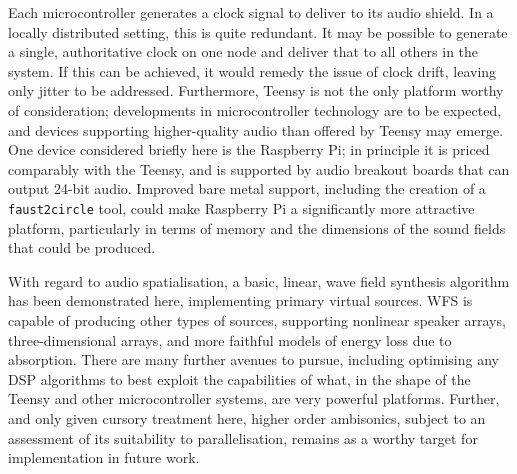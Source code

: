Each microcontroller generates a clock signal to deliver to its audio shield.
In a locally distributed setting, this is quite redundant.
It may be possible to generate a single, authoritative clock on one node and
deliver that to all others in the system.
If this can be achieved, it would remedy the issue of clock drift, leaving only
jitter to be addressed.
Furthermore, Teensy is not the only platform worthy of consideration;
developments in microcontroller technology are to be expected, and devices
supporting higher-quality audio than offered by Teensy may emerge.
One device considered briefly here is the Raspberry Pi;
in principle it is priced comparably with the Teensy, and is supported by audio
breakout boards that can output 24-bit audio.
Improved bare metal support, including the creation of a \texttt{faust2circle}
tool, could make Raspberry Pi a significantly more attractive platform,
particularly in terms of memory and the dimensions of the sound fields that
could be produced.

With regard to audio spatialisation, a basic, linear, wave field synthesis
algorithm has been demonstrated here, implementing primary virtual sources.
WFS is capable of producing other types of sources, supporting nonlinear
speaker arrays, three-dimensional arrays, and more faithful models of
energy loss due to absorption.
There are many further avenues to pursue, including optimising any DSP
algorithms to best exploit the capabilities of what, in the shape of the
Teensy and other microcontroller systems, are very powerful platforms.
Further, and only given cursory treatment here, higher order ambisonics, subject
to an assessment of its suitability to parallelisation, remains as a worthy
target for implementation in future work.
